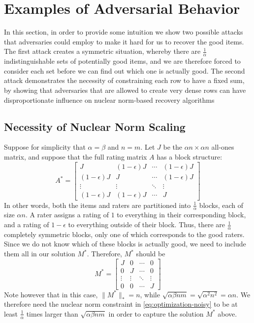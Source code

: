 \section{Examples of Adversarial Behavior}
\label{sec:adversary-examples}

In this section, in order to provide some intuition we show 
two possible attacks that adversaries could employ to make it 
hard for us to recover the good items. The first attack creates a 
symmetric situation, whereby there are $\frac{1}{\alpha}$ indistinguishable 
sets of potentially good items, and we are therefore forced to consider 
each set before we can find out which one is actually good. The 
second attack demonstrates the necessity of constraining each row 
to have a fixed sum, by showing that adversaries that are allowed to 
create very dense rows can have disproportionate influence on nuclear norm-based 
recovery algorithms

\subsection{Necessity of Nuclear Norm Scaling}

Suppose for simplicity that $\alpha = \beta$ and $n = m$. Let $J$ be the 
$\alpha n \times \alpha n$ all-ones matrix, and suppose that the full 
rating matrix $A$ has a block structure:
\begin{equation}
A^* = \left[ \begin{array}{cccc} J & (1-\epsilon)J & \cdots & (1-\epsilon)J \\ (1-\epsilon)J & J & \cdots & (1-\epsilon)J \\ \vdots & \vdots & \ddots & \vdots \\ (1-\epsilon)J & (1-\epsilon)J & \cdots & J \end{array} \right]
\end{equation}
In other words, both the items and raters are partitioned into $\frac{1}{\alpha}$ 
blocks, each of size $\alpha n$. A rater assigns a rating of $1$ to 
everything in their corresponding block, and a rating of $1-\epsilon$ to 
everything outside of their block. Thus, there are $\frac{1}{\alpha}$ completely 
symmetric blocks, only one of which corresponds to the good raters. Since we do 
not know which of these blocks is actually good, we need to include them all 
in our solution $M^*$. Therefore, $M^*$ should be
\begin{equation}
M^* = \left[ \begin{array}{cccc} J & 0 & \cdots & 0 \\ 0 & J & \cdots & 0 \\ \vdots & \vdots & \ddots & \vdots \\ 0 & 0 & \cdots & J \end{array} \right]
\end{equation}
Note however that in this case, $\|M^*\|_* = n$, while 
$\sqrt{\alpha\beta nm} = \sqrt{\alpha^2n^2} = \alpha n$. We therefore need the 
nuclear norm constraint in \eqref{eq:optimization-noisy} to be at least 
$\frac{1}{\alpha}$ times larger than $\sqrt{\alpha\beta nm}$ in order to capture 
the solution $M^*$ above.

